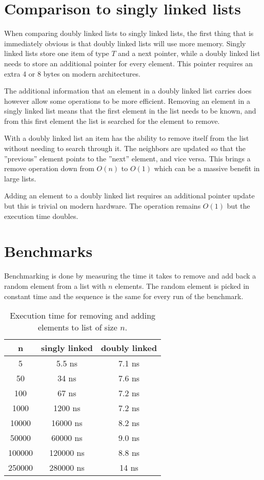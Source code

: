 \documentclass[a4paper,11pt]{article}
\begin{document}
\section*{Comparison to singly linked lists}

When comparing doubly linked lists to singly linked lists, the first thing that is immediately obvious is that doubly linked lists will use more memory.
Singly linked lists store one item of type $T$ and a next pointer, while a doubly linked list needs to store an additional pointer for every element.
This pointer requires an extra 4 or 8 bytes on modern architectures.

The additional information that an element in a doubly linked list carries does however allow some operations to be more efficient.
Removing an element in a singly linked list means that the first element in the list needs to be known, and from this first element the list is searched for the element to remove.

With a doubly linked list an item has the ability to remove itself from the list without needing to search through it.
The neighbors are updated so that the ''previous'' element points to the ''next'' element, and vice versa.
This brings a remove operation down from $O(n)$ to $O(1)$ which can be a massive benefit in large lists.

Adding an element to a doubly linked list requires an additional pointer update but this is trivial on modern hardware. The operation remains $O(1)$ but the execution time doubles.

\section*{Benchmarks}

Benchmarking is done by measuring the time it takes to remove and add back a random element from a list with $n$ elements.
The random element is picked in constant time and the sequence is the same for every run of the benchmark.

\begin{table}[H]
\centering
\begin{tabular}{|c|c|c|}
\hline
\textbf{n} & \textbf{singly linked} & \textbf{doubly linked} \\
\hline
	5 & 5.5 ns & 7.1 ns \\
	50 & 34 ns & 7.6 ns \\
	100 & 67 ns & 7.2 ns \\
	1000 & 1200 ns & 7.2 ns \\
	10000 & 16000 ns & 8.2 ns \\
	50000 & 60000 ns & 9.0 ns \\
	100000 & 120000 ns & 8.8 ns \\
	250000 & 280000 ns & 14 ns \\
\hline
\end{tabular}
\caption{Execution time for removing and adding elements to list of size $n$.}
\label{tab:table1}
\end{table}
\end{document}
